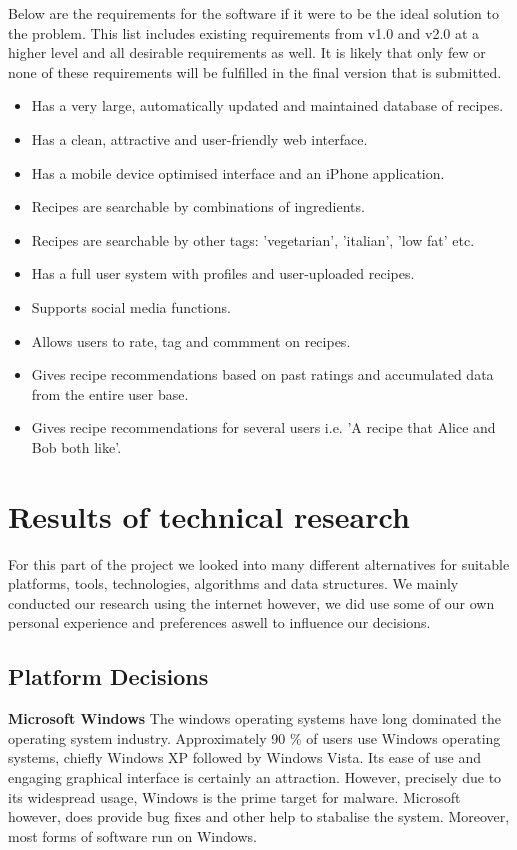 \documentclass[12pt]{article}
\begin{document}
Below are the requirements for the software if it were to be the ideal solution to the problem. This list includes existing requirements from v1.0 and v2.0 at a higher level and all desirable requirements as well. It is likely that only few or none
of these requirements will be fulfilled in the final version that is submitted. 

\begin{itemize}
	\item Has a very large, automatically updated and maintained database of recipes.
	\item Has a clean, attractive and user-friendly web interface.
	\item Has a mobile device optimised interface and an iPhone application.
	\item Recipes are searchable by combinations of ingredients.
	\item Recipes are searchable by other tags: 'vegetarian', 'italian', 'low fat' etc.
	\item Has a full user system with profiles and user-uploaded recipes.
	\item Supports social media functions.
	\item Allows users to rate, tag and commment on recipes.
	\item Gives recipe recommendations based on past ratings and accumulated data from the entire user base.
	\item Gives recipe recommendations for several users i.e. 'A recipe that Alice and Bob both like'.

\end{itemize}

\newpage
\section{Results of technical research}		%

For this part of the project we looked into many different alternatives for suitable platforms,
tools, technologies, algorithms and data structures. We mainly conducted our research using the internet however, 
we did use some of our own personal experience and preferences aswell to influence our decisions.

\subsection{Platform Decisions}
\vspace{5 mm}
\textbf{Microsoft Windows}
\newline
\newline
The windows operating systems have long dominated the operating system industry. Approximately 90 \% of users use Windows operating systems, chiefly Windows XP followed by Windows Vista. Its ease of use and engaging graphical interface is certainly an attraction. However, precisely due to its widespread usage, Windows is the prime target for malware. Microsoft however, does provide bug fixes and other help to stabalise the system. Moreover, most forms of software run on Windows.
\end{document}
